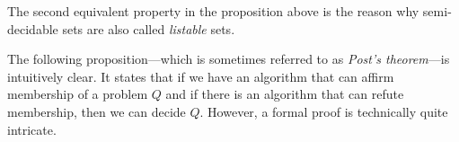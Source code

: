 

\begin{rem}
  The second equivalent property in the proposition above is the reason why
  semi-decidable sets are also called \emph{listable} sets.
\end{rem}

The following proposition---which is sometimes referred to as \emph{Post's
theorem}---is intuitively clear. It states that if we have an algorithm
that can affirm membership of a problem \(Q\) and if there is an algorithm that
can refute membership, then we can decide \(Q\). However, a formal proof is
technically quite intricate.


